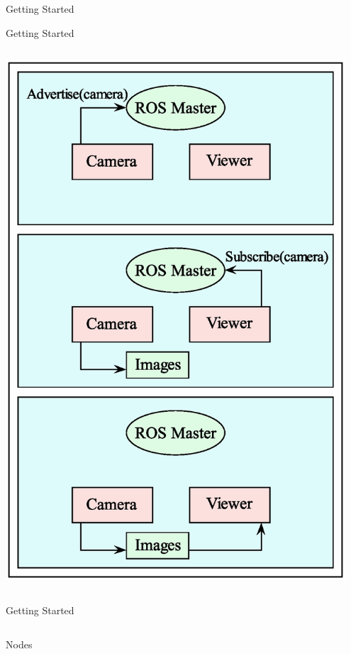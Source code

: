 \documentclass[9pt]{beamer}
\begin{document}
\begin{section}{Getting Started}
\begin{frame}{Getting Started}
\begin{columns}
            \begin{column}{0.5\textwidth}
                \begin{center}
                    \includegraphics[width=0.95\textwidth,trim={0cm 0cm 0cm 0cm},clip]{img/ros_master.eps}
                \end{center}           
            \end{column}        
        \end{columns}
    \end{frame}
    \begin{frame}{Getting Started} \label{frame:node}
        \begin{columns}
            \begin{column}{0.5\textwidth}
                \begin{block}{Nodes}
                    \begin{itemize}

\end{itemize}
\end{block}
\end{column}
\end{columns}
\end{frame}
\end{section}
\end{document}
